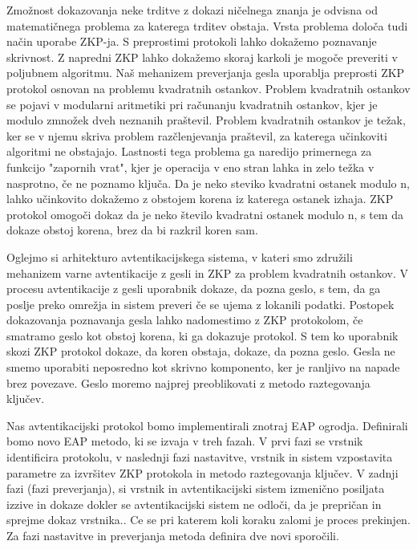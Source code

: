 Zmožnost dokazovanja neke trditve z dokazi ničelnega znanja je odvisna od matematičnega problema za katerega trditev obstaja.
Vrsta problema določa tudi način uporabe ZKP-ja. S preprostimi protokoli lahko dokažemo poznavanje skrivnost. Z napredni ZKP lahko dokažemo skoraj karkoli je mogoče preveriti v poljubnem algoritmu.
Naš mehanizem preverjanja gesla uporablja preprosti ZKP protokol osnovan na problemu kvadratnih ostankov.
Problem kvadratnih ostankov se pojavi v modularni aritmetiki pri računanju kvadratnih ostankov, kjer je modulo zmnožek dveh neznanih praštevil.
Problem kvadratnih ostankov je težak, ker se v njemu skriva problem razčlenjevanja praštevil, za katerega učinkoviti algoritmi ne obstajajo.
Lastnosti tega problema ga naredijo primernega za funkcijo "zapornih vrat", kjer je operacija v eno stran lahka in zelo težka v nasprotno, če ne poznamo ključa. Da je neko steviko kvadratni ostanek modulo n, lahko učinkovito dokažemo z obstojem korena iz katerega ostanek izhaja. ZKP protokol omogoči dokaz da je neko število kvadratni ostanek modulo n, s tem da dokaze obstoj korena, brez da bi razkril koren sam.


Oglejmo si arhitekturo avtentikacijskega sistema, v kateri smo združili mehanizem varne avtentikacije z gesli in ZKP za problem kvadratnih ostankov.
V procesu avtentikacije z gesli uporabnik dokaze, da pozna geslo, s tem, da ga poslje preko omrežja in sistem preveri če se ujema z lokanili podatki.
Postopek dokazovanja poznavanja gesla lahko nadomestimo z ZKP protokolom, če smatramo geslo kot obstoj korena, ki ga dokazuje protokol. 
S tem ko uporabnik skozi ZKP protokol dokaze, da koren obstaja, dokaze, da pozna geslo.
Gesla ne smemo uporabiti neposredno kot skrivno komponento, ker je ranljivo na napade brez povezave. Geslo moremo najprej preoblikovati z metodo raztegovanja ključev.

%

Nas avtentikacijski protokol bomo implementirali znotraj EAP ogrodja.
Definirali bomo novo EAP metodo, ki se izvaja v treh fazah.
V prvi fazi se vrstnik identificira protokolu, 
v naslednji fazi nastavitve, vrstnik in sistem vzpostavita parametre za izvršitev ZKP protokola in metodo raztegovanja ključev.
V zadnji fazi (fazi preverjanja), si vrstnik in avtentikacijski sistem izmenično posiljata izzive in dokaze dokler se avtentikacijski sistem ne odloči, da je prepričan in sprejme dokaz vrstnika..
Ce se pri katerem koli koraku zalomi je proces prekinjen.
Za fazi nastavitve in preverjanja metoda definira dve novi sporočili.


